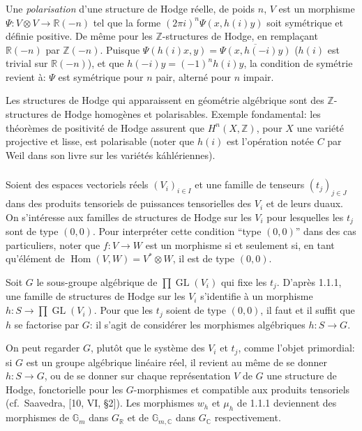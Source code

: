 \documentclass[12pt,a4paper]{article}
\theoremstyle{plain}
\theoremstyle{definition}
\theoremstyle{remark}
\DeclareMathOperator{\Hom}{Hom}
\DeclareMathOperator{\GL}{GL}
\newcommand{\ZZ}{\mathbb{Z}}
\newcommand{\RR}{\mathbb{R}}
\newcommand{\CC}{\mathbb{C}}
\newcommand{\Gm}{\mathbb{G}}
\begin{document}
\subsubsection{}

Une \textit{polarisation} d'une structure de Hodge r\'eelle, de poids $n$, $V$ est un morphisme $\Psi:V \otimes V \to \RR(-n)$ tel que la forme $(2\pi i)^n \Psi(x, h(i)y)$ soit sym\'etrique et d\'efinie positive. De m\^eme pour les $\ZZ$-structures de Hodge, en rempla\c{c}ant $\RR(-n)$ par $\ZZ(-n)$. Puisque $\Psi(h(i)x, y) = \overline{\Psi(x, h(-i)y)}$ ($h(i)$ est trivial sur $\RR(-n)$), et que $h(-i)y = (-1)^n h(i)y$, la condition de sym\'etrie revient \`a: $\Psi$ est sym\'etrique pour $n$ pair, altern\'e pour $n$ impair.

Les structures de Hodge qui apparaissent en g\'eom\'etrie alg\'ebrique sont des $\ZZ$-structures de Hodge homog\`enes et polarisables. Exemple fondamental: les th\'eor\`emes de positivit\'e de Hodge assurent que $H^n(X,\ZZ)$, pour $X$ une vari\'et\'e projective et lisse, est polarisable (noter que $h(i)$ est l'op\'eration not\'ee $C$ par Weil dans son livre sur les vari\'et\'es k\'ahl\'eriennes).

\subsubsection{}

Soient des espaces vectoriels r\'eels $(V_i)_{i \in I}$ et une famille de tenseurs $(t_j)_{j \in J}$ dans des produits tensoriels de puissances tensorielles des $V_i$ et de leurs duaux. On s'int\'eresse aux familles de structures de Hodge sur les $V_i$ pour lesquelles les $t_j$ sont de type $(0,0)$. Pour interpr\'eter cette condition ``type $(0,0)$'' dans des cas particuliers, noter que $f:V \to W$ est un morphisme si et seulement si, en tant qu'\'el\'ement de $\Hom(V,W) = V^* \otimes W$, il est de type $(0,0)$.

Soit $G$ le sous-groupe alg\'ebrique de $\prod \GL(V_i)$ qui fixe les $t_j$. D'apr\`es 1.1.1, une famille de structures de Hodge sur les $V_i$ s'identifie \`a un morphisme $h:S \to \prod \GL(V_i)$. Pour que les $t_j$ soient de type $(0,0)$, il faut et il suffit que $h$ se factorise par $G$: il s'agit de consid\'erer les morphismes alg\'ebriques $h:S \to G$.

On peut regarder $G$, plut\^ot que le syst\`eme des $V_i$ et $t_j$, comme l'objet primordial: si $G$ est un groupe alg\'ebrique lin\'eaire r\'eel, il revient au m\^eme de se donner $h:S \to G$, ou de se donner sur chaque repr\'esentation $V$ de $G$ une structure de Hodge, fonctorielle pour les $G$-morphismes et compatible aux produits tensoriels (cf.~Saavedra, [10, VI, \S2]). Les morphismes $w_h$ et $\mu_h$ de 1.1.1 deviennent des morphismes de $\Gm_m$ dans $G_{\RR}$ et de $\Gm_{m,\CC}$ dans $G_{\CC}$ respectivement.
\end{document}
